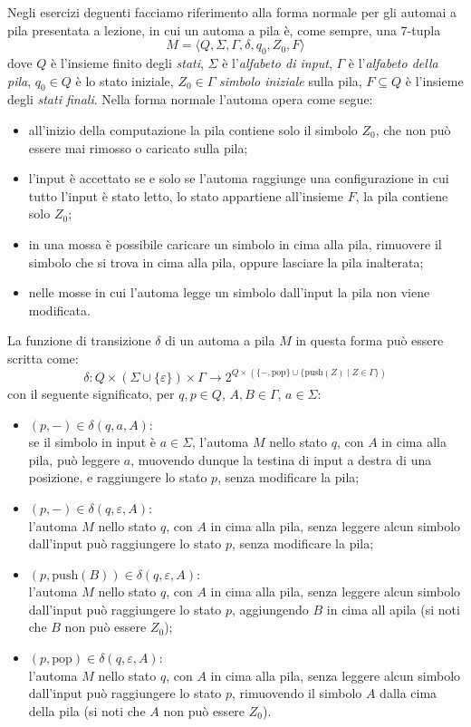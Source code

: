 \documentclass[12pt, answers]{exam}
\begin{document}
Negli esercizi deguenti facciamo riferimento alla forma normale per gli automai a pila presentata a lezione, in cui un automa a pila è, come sempre, una 7-tupla 
$$M = \langle Q, \Sigma, \Gamma, \delta, q_0, Z_0, F\rangle$$
dove $Q$ è l'insieme finito degli \textit{stati}, $\Sigma$ è l'\textit{alfabeto di input}, $\Gamma$ è l'\textit{alfabeto della pila}, $q_0 \in Q$ è lo stato iniziale, $Z_0 \in \Gamma$ \textit{simbolo iniziale} sulla pila, $F \subseteq Q$ è l'insieme degli \textit{stati finali}.
Nella forma normale l'automa opera come segue:
\begin{itemize}
	\item all'inizio della computazione la pila contiene solo il simbolo $Z_0$, che non può essere mai rimosso o caricato sulla pila;
	\item l'input è accettato se e solo se l'automa raggiunge una configurazione in cui tutto l'input è stato letto, lo stato appartiene all'insieme $F$, la pila contiene solo $Z_0$;
	\item in una mossa è possibile caricare un simbolo in cima alla pila, rimuovere il simbolo che si trova in cima alla pila, oppure lasciare la pila inalterata;
	\item nelle mosse in cui l'automa legge un simbolo dall'input la pila non viene modificata.
\end{itemize}
La funzione di transizione $\delta$ di un automa a pila $M$ in questa forma può essere scritta come:
$$ \delta : Q \times (\Sigma \cup \{\varepsilon\} ) \times  \Gamma \rightarrow 2^{Q \times (\{-, \text{pop}\} \cup \{\text{push}(Z) \mid Z \in \Gamma\})} $$
con il seguente significato, per $q, p \in Q$, $A, B \in \Gamma$, $a \in \Sigma$:
\begin{itemize}
	\item $(p, -) \in \delta(q, a, A)$:\\
		\noindent se il simbolo in input è $a \in \Sigma$, l'automa $M$ nello stato $q$, con $A$ in cima alla pila, può leggere $a$, muovendo dunque la testina di input a destra di una posizione, e raggiungere lo stato $p$, senza modificare la pila;
	\item $(p, -) \in \delta(q, \varepsilon, A)$:\\
		\noindent l'automa $M$ nello stato $q$, con $A$ in cima alla pila, senza leggere alcun simbolo dall'input può raggiungere lo stato $p$, senza modificare la pila;
	\item $(p, \text{push}(B)) \in \delta(q, \varepsilon, A)$:\\
		\noindent l'automa $M$ nello stato $q$, con $A$ in cima alla pila, senza leggere alcun simbolo dall'input può raggiungere lo stato $p$, aggiungendo $B$ in cima all apila (si noti che $B$ non può essere $Z_0$);
	\item $(p, \text{pop}) \in \delta(q, \varepsilon, A)$:\\
		\noindent l'automa $M$ nello stato $q$, con $A$ in cima alla pila, senza leggere alcun simbolo dall'input può raggiungere lo stato $p$, rimuovendo il simbolo $A$ dalla cima della pila (si noti che $A$ non può essere $Z_0$).
\end{itemize}
\end{document}
